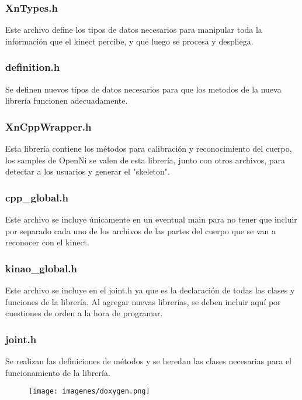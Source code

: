\documentclass{beamer}
\begin{document}
	\begin{frame}
		\frametitle{XnTypes.h}
		Este archivo define los tipos de datos necesarios para manipular toda la información que el kinect percibe, y que luego se procesa y despliega. 
	\end{frame}
	\begin{frame}
		\frametitle{definition.h}
		Se definen nuevos tipos de datos necesarios para que los metodos de la nueva librería funcionen adecuadamente.
	\end{frame}
	\begin{frame}
		\frametitle{XnCppWrapper.h}
		Esta librería contiene los métodos para calibración y reconocimiento del cuerpo, los samples de OpenNi se valen de esta librería, junto con otros archivos, para detectar a los usuarios y generar el "skeleton".
	\end{frame}
	\begin{frame}
		\frametitle{cpp\_global.h}
		Este archivo se incluye únicamente en un eventual main para no tener que incluir por separado cada uno de los archivos de las partes del cuerpo que se van a reconocer con el kinect.
	\end{frame}
	\begin{frame}
		\frametitle{kinao\_global.h}
		Este archivo se incluye en el joint.h ya que es la declaración de todas las clases y funciones de la librería. Al agregar nuevas librerías, se  deben incluir aquí por cuestiones de orden a la hora de programar.
	\end{frame}
	\begin{frame}
		\frametitle{joint.h}
		Se realizan las definiciones de métodos y se heredan las clases necesarias para el funcionamiento de la librería.

		\begin{figure}
			\centering
			\texttt{[image: imagenes/doxygen.png]}
		\end{figure}

	\end{frame}
\end{document}
